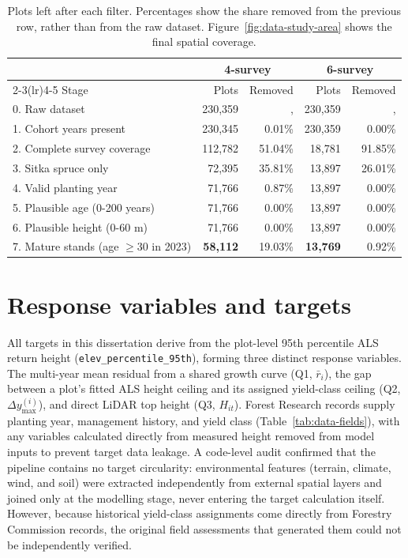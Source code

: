 \documentclass[logo,msc,ai]{infthesis}           %
\begin{document}
\begin{table}[!htbp]
\centering
\scriptsize
\begin{tabular}{lrrrr}
\toprule
& \multicolumn{2}{c}{4-survey} & \multicolumn{2}{c}{6-survey} \\
\cmidrule(lr){2-3}\cmidrule(lr){4-5}
Stage & Plots & Removed & Plots & Removed \\
\midrule
0. Raw dataset
& 230,359 &, & 230,359 &, \\
1. Cohort years present
& 230,345 & 0.01\% & 230,359 & 0.00\% \\
2. Complete survey coverage
& 112,782 & 51.04\% & 18,781 & 91.85\% \\
3. Sitka spruce only
& 72,395 & 35.81\% & 13,897 & 26.01\% \\
4. Valid planting year
& 71,766 & 0.87\% & 13,897 & 0.00\% \\
5. Plausible age (0-200 years)
& 71,766 & 0.00\% & 13,897 & 0.00\% \\
6. Plausible height (0-60 m)
& 71,766 & 0.00\% & 13,897 & 0.00\% \\
7. Mature stands (age $\geq 30$ in 2023)
& \textbf{58,112} & 19.03\%
& \textbf{13,769} & 0.92\% \\
\bottomrule
\end{tabular}
\caption{\small{Plots left after each filter. Percentages show the share removed from the previous row, rather than from the raw dataset. Figure~\ref{fig:data-study-area} shows the final spatial coverage.}}
\label{tab:data-cleaning-funnel}
\end{table}

\section{Response variables and targets}
All targets in this dissertation derive from the plot-level 95th percentile ALS return height (\texttt{elev\_percentile\_95th}), forming three distinct response variables. The multi-year mean residual from a shared growth curve (Q1, $\bar{r}_i$), the gap between a plot's fitted ALS height ceiling and its assigned yield-class ceiling (Q2, $\Delta y_{\max}^{(i)}$), and direct LiDAR top height (Q3, $H_{it}$). Forest Research records supply planting year, management history, and yield class (Table~\ref{tab:data-fields}), with any variables calculated directly from measured height removed from model inputs to prevent target data leakage. A code-level audit confirmed that the pipeline contains no target circularity: environmental features (terrain, climate, wind, and soil) were extracted independently from external spatial layers and joined only at the modelling stage, never entering the target calculation itself. However, because historical yield-class assignments come directly from Forestry Commission records, the original field assessments that generated them could not be independently verified.
\end{document}
